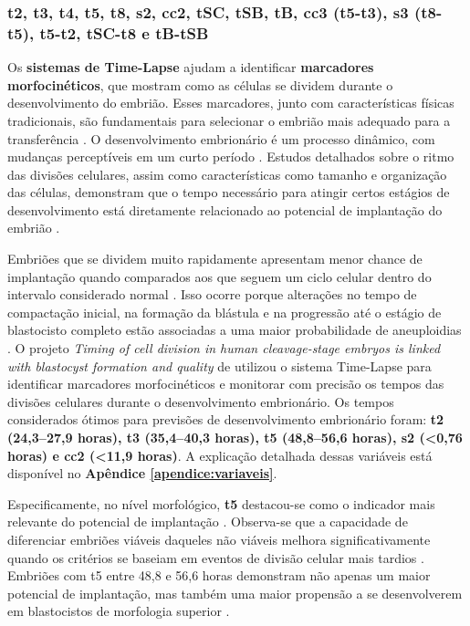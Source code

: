 \subsubsection{t2, t3, t4, t5, t8, s2, cc2, tSC, tSB, tB, cc3 (t5-t3), s3 (t8-t5), t5-t2,  tSC-t8 e tB-tSB}
Os \textbf{sistemas de Time-Lapse} ajudam a identificar \textbf{marcadores morfocinéticos}, que mostram como as células se dividem durante o desenvolvimento do embrião. Esses marcadores, junto com características físicas tradicionais, são fundamentais para selecionar o embrião mais adequado para a transferência \cite{souzarebeca2022}. O desenvolvimento embrionário é um processo dinâmico, com mudanças perceptíveis em um curto período \cite{cruz2012}. Estudos detalhados sobre o ritmo das divisões celulares, assim como características como tamanho e organização das células, demonstram que o tempo necessário para atingir certos estágios de desenvolvimento está diretamente relacionado ao potencial de implantação do embrião \cite{souzarebeca2022}.

Embriões que se dividem muito rapidamente apresentam menor chance de implantação quando comparados aos que seguem um ciclo celular dentro do intervalo considerado normal  \cite{cruz2012}. Isso ocorre porque alterações no tempo de compactação inicial, na formação da blástula e na progressão até o estágio de blastocisto completo estão associadas a uma maior probabilidade de aneuploidias \cite{cruz2012}. O projeto \textit{Timing of cell division in human cleavage-stage embryos is linked with blastocyst formation and quality} de  utilizou o sistema Time-Lapse para identificar marcadores morfocinéticos e monitorar com precisão os tempos das divisões celulares durante o desenvolvimento embrionário. Os tempos considerados ótimos para previsões de desenvolvimento embrionário foram: \textbf{t2 (24,3–27,9 horas), t3 (35,4–40,3 horas), t5 (48,8–56,6 horas), s2 (<0,76 horas) e cc2 (<11,9 horas)}. A explicação detalhada dessas variáveis está disponível no \textbf{Apêndice \ref{apendice:variaveis}}. 

Especificamente, no nível morfológico, \textbf{t5} destacou-se como o indicador mais relevante do potencial de implantação \cite{cruz2012}. Observa-se que a capacidade de diferenciar embriões viáveis daqueles não viáveis melhora significativamente quando os critérios se baseiam em eventos de divisão celular mais tardios \cite{cruz2012}. Embriões com t5 entre 48,8 e 56,6 horas demonstram não apenas um maior potencial de implantação, mas também uma maior propensão a se desenvolverem em blastocistos de morfologia superior \cite{cruz2012}.

